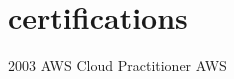 \section{certifications}

\begin{entrylist}
	\certentry
	{2003}
	{AWS {\normalfont Cloud Practitioner}}
	{AWS}
\end{entrylist}
